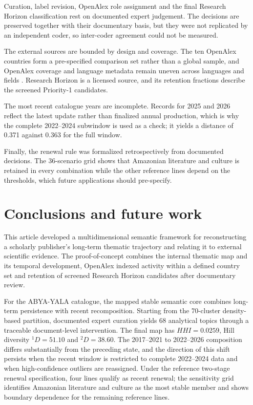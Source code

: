 \documentclass[futureinternet,article,submit,moreauthors]{Definitions/mdpi}
\newcommand{\ABYA}{ABYA-YALA\xspace}
\begin{document}
Curation, label revision, OpenAlex role assignment and the final Research Horizon classification rest on documented expert judgement. The decisions are preserved together with their documentary basis, but they were not replicated by an independent coder, so inter-coder agreement could not be measured.

The external sources are bounded by design and coverage. The ten OpenAlex countries form a pre-specified comparison set rather than a global sample, and OpenAlex coverage and language metadata remain uneven across languages and fields \citep{gallardo2024openalex,cespedes2025linguistic,visser2021comparison}. Research Horizon is a licensed source, and its retention fractions describe the screened Priority-1 candidates.

The most recent catalogue years are incomplete. Records for 2025 and 2026 reflect the latest update rather than finalized annual production, which is why the complete 2022--2024 subwindow is used as a check; it yields a distance of 0.371 against 0.363 for the full window.

Finally, the renewal rule was formalized retrospectively from documented decisions. The 36-scenario grid shows that Amazonian literature and culture is retained in every combination while the other reference lines depend on the thresholds, which future applications should pre-specify.


\section{Conclusions and future work}\label{sec:conclusion}

This article developed a multidimensional semantic framework for reconstructing a scholarly publisher's long-term thematic trajectory and relating it to external scientific evidence. The proof-of-concept combines the internal thematic map and its temporal development, OpenAlex indexed activity within a defined country set and retention of screened Research Horizon candidates after documentary review.

For the \ABYA catalogue, the mapped stable semantic core combines long-term persistence with recent recomposition. Starting from the 70-cluster density-based partition, documented expert curation yields 68 analytical topics through a traceable document-level intervention. The final map has $HHI=0.0259$, Hill diversity ${}^{1}D=51.10$ and ${}^{2}D=38.60$. The 2017--2021 to 2022--2026 composition differs substantially from the preceding state, and the direction of this shift persists when the recent window is restricted to complete 2022--2024 data and when high-confidence outliers are reassigned. Under the reference two-stage renewal specification, four lines qualify as recent renewal; the sensitivity grid identifies Amazonian literature and culture as the most stable member and shows boundary dependence for the remaining reference lines.
\end{document}

